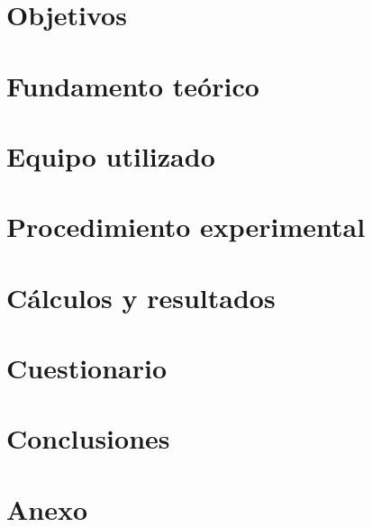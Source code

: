 \documentclass[12pt, a4paper]{article}
\begin{document}


\pagestyle{fancy}
\fancyfoot{} %
\fancyfoot[R]{\thepage}

\tableofcontents
\clearpage

\section{Objetivos}


\section{Fundamento teórico}


\section{Equipo utilizado}


\section{Procedimiento experimental}


\section{Cálculos y resultados}


\section{Cuestionario}


\section{Conclusiones}


\printbibliography

\clearpage

\listoffigures
\listoftables

\clearpage

\section{Anexo}

\end{document}
